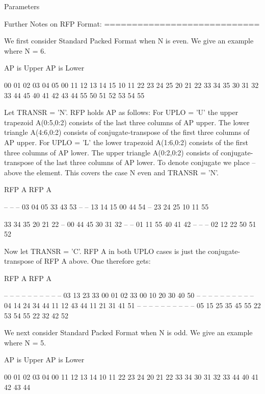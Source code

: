 \begin{DoxyParams}[1]{Parameters}
\begin{DoxyVerb}
  Further Notes on RFP Format:
  ============================

  We first consider Standard Packed Format when N is even.
  We give an example where N = 6.

     AP is Upper             AP is Lower

   00 01 02 03 04 05       00
      11 12 13 14 15       10 11
         22 23 24 25       20 21 22
            33 34 35       30 31 32 33
               44 45       40 41 42 43 44
                  55       50 51 52 53 54 55

  Let TRANSR = 'N'. RFP holds AP as follows:
  For UPLO = 'U' the upper trapezoid A(0:5,0:2) consists of the last
  three columns of AP upper. The lower triangle A(4:6,0:2) consists of
  conjugate-transpose of the first three columns of AP upper.
  For UPLO = 'L' the lower trapezoid A(1:6,0:2) consists of the first
  three columns of AP lower. The upper triangle A(0:2,0:2) consists of
  conjugate-transpose of the last three columns of AP lower.
  To denote conjugate we place -- above the element. This covers the
  case N even and TRANSR = 'N'.

         RFP A                   RFP A

                                -- -- --
        03 04 05                33 43 53
                                   -- --
        13 14 15                00 44 54
                                      --
        23 24 25                10 11 55

        33 34 35                20 21 22
        --
        00 44 45                30 31 32
        -- --
        01 11 55                40 41 42
        -- -- --
        02 12 22                50 51 52

  Now let TRANSR = 'C'. RFP A in both UPLO cases is just the conjugate-
  transpose of RFP A above. One therefore gets:

           RFP A                   RFP A

     -- -- -- --                -- -- -- -- -- --
     03 13 23 33 00 01 02    33 00 10 20 30 40 50
     -- -- -- -- --                -- -- -- -- --
     04 14 24 34 44 11 12    43 44 11 21 31 41 51
     -- -- -- -- -- --                -- -- -- --
     05 15 25 35 45 55 22    53 54 55 22 32 42 52

  We next  consider Standard Packed Format when N is odd.
  We give an example where N = 5.

     AP is Upper                 AP is Lower

   00 01 02 03 04              00
      11 12 13 14              10 11
         22 23 24              20 21 22
            33 34              30 31 32 33
               44              40 41 42 43 44


\end{DoxyVerb}
\end{DoxyParams}
